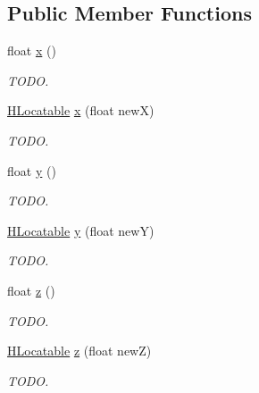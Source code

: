 \subsection*{Public Member Functions}
\begin{DoxyCompactItemize}
\item 
float \hyperlink{interfacehype_1_1core_1_1interfaces_1_1_h_locatable_a433e89000135fd8aceebeb6f7e39b8f3}{x} ()
\begin{DoxyCompactList}\small\item\em T\-O\-D\-O. \end{DoxyCompactList}\item 
\hyperlink{interfacehype_1_1core_1_1interfaces_1_1_h_locatable}{H\-Locatable} \hyperlink{interfacehype_1_1core_1_1interfaces_1_1_h_locatable_a92bda322e11f361ae1c121017b93341e}{x} (float new\-X)
\begin{DoxyCompactList}\small\item\em T\-O\-D\-O. \end{DoxyCompactList}\item 
float \hyperlink{interfacehype_1_1core_1_1interfaces_1_1_h_locatable_aa8148a4289eb112302a621cbc3b4a3e1}{y} ()
\begin{DoxyCompactList}\small\item\em T\-O\-D\-O. \end{DoxyCompactList}\item 
\hyperlink{interfacehype_1_1core_1_1interfaces_1_1_h_locatable}{H\-Locatable} \hyperlink{interfacehype_1_1core_1_1interfaces_1_1_h_locatable_a4313d2c0e2769c99f82e46da21aeb488}{y} (float new\-Y)
\begin{DoxyCompactList}\small\item\em T\-O\-D\-O. \end{DoxyCompactList}\item 
float \hyperlink{interfacehype_1_1core_1_1interfaces_1_1_h_locatable_a39eb12015a40fe494f789607dec9c484}{z} ()
\begin{DoxyCompactList}\small\item\em T\-O\-D\-O. \end{DoxyCompactList}\item 
\hyperlink{interfacehype_1_1core_1_1interfaces_1_1_h_locatable}{H\-Locatable} \hyperlink{interfacehype_1_1core_1_1interfaces_1_1_h_locatable_a8182b3128b5b09feeda0900e987bcee5}{z} (float new\-Z)
\begin{DoxyCompactList}\small\item\em T\-O\-D\-O. \end{DoxyCompactList}\end{DoxyCompactItemize}


